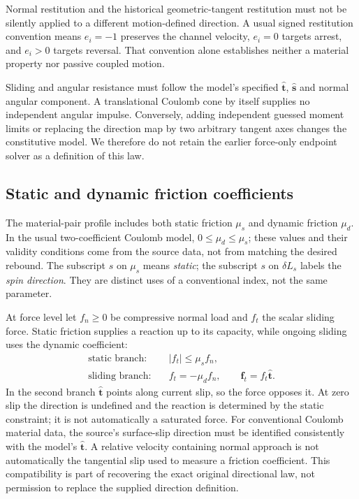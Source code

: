 \documentclass[11pt,a4paper]{article}
\begin{document}
Normal restitution and the historical geometric-tangent restitution must not be silently applied to a different motion-defined direction. A usual signed restitution convention means $e_i=-1$ preserves the channel velocity, $e_i=0$ targets arrest, and $e_i>0$ targets reversal. That convention alone establishes neither a material property nor passive coupled motion.

Sliding and angular resistance must follow the model's specified $\hat{\mathbf{t}}$, $\hat{\mathbf{s}}$ and normal angular component. A translational Coulomb cone by itself supplies no independent angular impulse. Conversely, adding independent guessed moment limits or replacing the direction map by two arbitrary tangent axes changes the constitutive model. We therefore do not retain the earlier force-only endpoint solver as a definition of this law.

\subsection{Static and dynamic friction coefficients}
The material-pair profile includes both static friction $\mu_s$ and dynamic friction $\mu_d$. In the usual two-coefficient Coulomb model, $0\le\mu_d\le\mu_s$; these values and their validity conditions come from the source data, not from matching the desired rebound\cite{drakefriction}. The subscript $s$ on $\mu_s$ means \emph{static}; the subscript $s$ on $\delta L_s$ labels the \emph{spin direction}. They are distinct uses of a conventional index, not the same parameter.

At force level let $f_n\ge0$ be compressive normal load and $f_t$ the scalar sliding force. Static friction supplies a reaction up to its capacity, while ongoing sliding uses the dynamic coefficient:
\begin{align}
\text{static branch:}\quad &|f_t|\le\mu_s f_n,\\
\text{sliding branch:}\quad &f_t=-\mu_d f_n,\qquad
\mathbf f_t=f_t\hat{\mathbf t}.
\end{align}
In the second branch $\hat{\mathbf t}$ points along current slip, so the force opposes it. At zero slip the direction is undefined and the reaction is determined by the static constraint; it is not automatically a saturated force. For conventional Coulomb material data, the source's surface-slip direction must be identified consistently with the model's $\hat{\mathbf t}$. A relative velocity containing normal approach is not automatically the tangential slip used to measure a friction coefficient. This compatibility is part of recovering the exact original directional law, not permission to replace the supplied direction definition.
\end{document}
